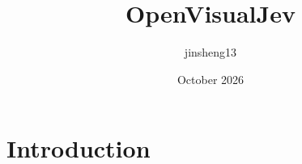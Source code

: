 \documentclass{article}
\title{OpenVisualJev}
\author{jinsheng13 }
\date{October 2026}
\begin{document}
\maketitle

\section{Introduction}
\end{document}
